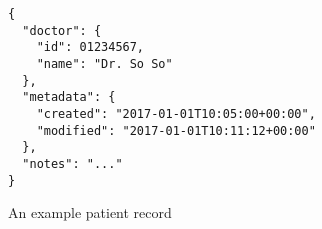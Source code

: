 \begin{listing}[H]
  \centering
  \begin{verbatim}
{
  "doctor": {
    "id": 01234567,
    "name": "Dr. So So"
  },
  "metadata": {
    "created": "2017-01-01T10:05:00+00:00",
    "modified": "2017-01-01T10:11:12+00:00"
  },
  "notes": "..."
}
  \end{verbatim}
  \caption{
  	An example patient record
  }
  \label{code:patient_record_json}
\end{listing}
